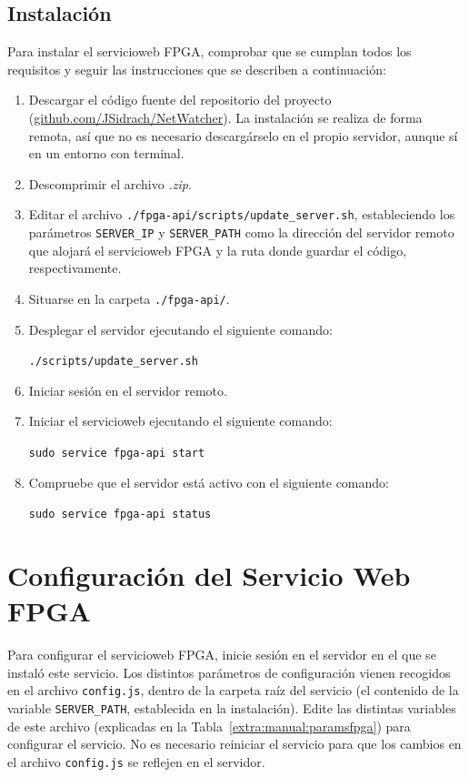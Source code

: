 \subsection*{Instalación}
Para instalar el \gls{servicioweb} \gls{FPGA}, comprobar que se cumplan todos los requisitos y seguir las instrucciones que se describen a continuación:
\begin{enumerate}
  \item Descargar el código fuente del repositorio del proyecto (\href{https://github.com/JSidrach/NetWatcher/archive/master.zip}{\footnotesize{github.com/JSidrach/NetWatcher}}).
  La instalación se realiza de forma remota, así que no es necesario descargárselo en el propio servidor, aunque sí en un entorno con terminal.
  \item Descomprimir el archivo \textit{.zip}.
  \item Editar el archivo \texttt{./fpga-api/scripts/update\_server.sh}, estableciendo los parámetros \texttt{SERVER\_IP} y \texttt{SERVER\_PATH} como la dirección del servidor remoto que alojará el \gls{servicioweb} \gls{FPGA} y la ruta donde guardar el código, respectivamente.
  \item Situarse en la carpeta \texttt{./fpga-api/}.
  \item Desplegar el servidor ejecutando el siguiente comando:

  \texttt{./scripts/update\_server.sh}
  \item Iniciar sesión en el servidor remoto.
  \item Iniciar el \gls{servicioweb} ejecutando el siguiente comando:

  \texttt{sudo service fpga-api start}
  \item Compruebe que el servidor está activo con el siguiente comando:

  \texttt{sudo service fpga-api status}
\end{enumerate}


\section{Configuración del Servicio Web FPGA\label{extra:manual:configfpga}}
Para configurar el \gls{servicioweb} \gls{FPGA}, inicie sesión en el servidor en el que se instaló este servicio.
Los distintos parámetros de configuración vienen recogidos en el archivo \texttt{config.js}, dentro de la carpeta raíz del servicio (el contenido de la variable \texttt{SERVER\_PATH}, establecida en la instalación).
Edite las distintas variables de este archivo (explicadas en la Tabla~\ref{extra:manual:paramsfpga}) para configurar el servicio.
No es necesario reiniciar el servicio para que los cambios en el archivo \texttt{config.js} se reflejen en el servidor.

